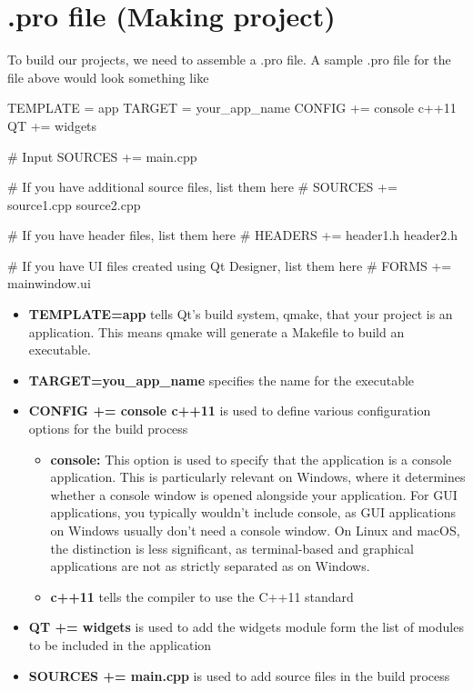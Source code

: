 \documentclass{report}
\begin{document}
    \section*{.pro file (Making project)}
    \bigbreak \noindent 
    To build our projects, we need to assemble a .pro file. A sample .pro file for the file above would look something like
    \bigbreak \noindent 
    \begin{cppcode}
TEMPLATE = app
TARGET = your_app_name
CONFIG += console c++11
QT += widgets

# Input
SOURCES += main.cpp

# If you have additional source files, list them here
# SOURCES += source1.cpp source2.cpp

# If you have header files, list them here
# HEADERS += header1.h header2.h

# If you have UI files created using Qt Designer, list them here
# FORMS += mainwindow.ui
    \end{cppcode}
    \begin{itemize}
        \item \textbf{TEMPLATE=app} tells Qt's build system, qmake, that your project is an application. This means qmake will generate a Makefile to build an executable.
        \item \textbf{TARGET=you\_app\_name} specifies the name for the executable
        \item \textbf{CONFIG += console c++11} is used to define various configuration options for the build process
            \begin{itemize}
                \item \textbf{console:} This option is used to specify that the application is a console application. This is particularly relevant on Windows, where it determines whether a console window is opened alongside your application. For GUI applications, you typically wouldn't include console, as GUI applications on Windows usually don't need a console window. On Linux and macOS, the distinction is less significant, as terminal-based and graphical applications are not as strictly separated as on Windows.
                \item \textbf{c++11} tells the compiler to use the C++11 standard
            \end{itemize}
        \item \textbf{QT += widgets} is used to add the widgets module form the list of modules to be included in the application 
        \item \textbf{SOURCES += main.cpp} is used to add source files in the build process
    \end{itemize}
\end{document}
